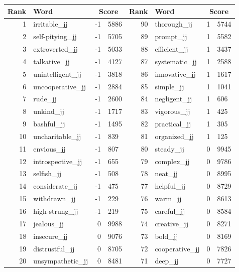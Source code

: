 \begin{table}[tbp]
    \begin{tabular}{| rlr@{.}l | rlr@{.}l |}
    \hline
    \textbf{Rank} & \textbf{Word} & \multicolumn{2}{c|}{\textbf{Score}} & \textbf{Rank} & \textbf{Word} & \multicolumn{2}{c|}{\textbf{Score}} \\
    \hline
    1 & irritable\_jj & -1 & 5886    &    90 & thorough\_jj & 1 & 5744 \\
    2 & self-pitying\_jj & -1 & 5705    &    89 & prompt\_jj & 1 & 5582 \\
    3 & extroverted\_jj & -1 & 5033    &    88 & efficient\_jj & 1 & 3437 \\
    4 & talkative\_jj & -1 & 4127    &    87 & systematic\_jj & 1 & 2588 \\
    5 & unintelligent\_jj & -1 & 3818    &    86 & innovative\_jj & 1 & 1617 \\
    6 & uncooperative\_jj & -1 & 2884    &    85 & simple\_jj & 1 & 1041 \\
    7 & rude\_jj & -1 & 2600    &    84 & negligent\_jj & 1 & 606 \\
    8 & unkind\_jj & -1 & 1717    &    83 & vigorous\_jj & 1 & 425 \\
    9 & bashful\_jj & -1 & 1495    &    82 & practical\_jj & 1 & 305 \\
    10 & uncharitable\_jj & -1 & 839    &    81 & organized\_jj & 1 & 125 \\
    11 & envious\_jj & -1 & 807    &    80 & steady\_jj & 0 & 9945 \\
    12 & introspective\_jj & -1 & 655    &    79 & complex\_jj & 0 & 9786 \\
    13 & selfish\_jj & -1 & 508    &    78 & neat\_jj & 0 & 8995 \\
    14 & considerate\_jj & -1 & 475    &    77 & helpful\_jj & 0 & 8729 \\
    15 & withdrawn\_jj & -1 & 229    &    76 & warm\_jj & 0 & 8613 \\
    16 & high-strung\_jj & -1 & 219    &    75 & careful\_jj & 0 & 8584 \\
    17 & jealous\_jj & 0 & 9988    &    74 & creative\_jj & 0 & 8271 \\
    18 & insecure\_jj & 0 & 9076    &    73 & bold\_jj & 0 & 8169 \\
    19 & distrustful\_jj & 0 & 8705    &    72 & cooperative\_jj & 0 & 7826 \\
    20 & unsympathetic\_jj & 0 & 8481    &    71 & deep\_jj & 0 & 7727 \\

\end{tabular}
\end{table}
